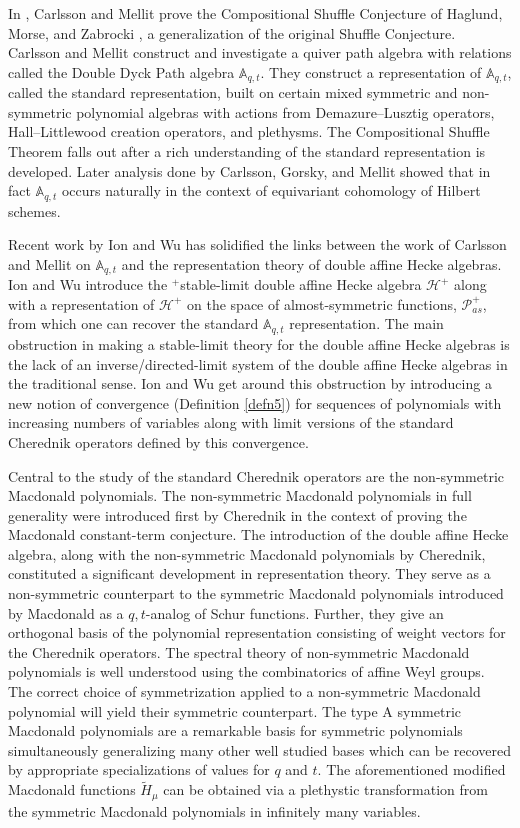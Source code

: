 \documentclass[11pt]{article}
\theoremstyle{definition}
\numberwithin{equation}{section}
\begin{document}
In \cite{CM_2015}, Carlsson and Mellit prove the Compositional Shuffle Conjecture of Haglund, Morse, and Zabrocki \cite{HMZ}, a generalization of the original Shuffle Conjecture. Carlsson and Mellit construct and investigate a quiver path algebra with relations called the Double Dyck Path algebra $\mathbb{A}_{q,t}$. They construct a representation of $\mathbb{A}_{q,t}$, called the standard representation, built on certain mixed symmetric and non-symmetric polynomial algebras with actions from Demazure--Lusztig operators, Hall--Littlewood creation operators, and plethysms. The Compositional Shuffle Theorem 
falls out after a rich understanding of the standard representation is developed. Later analysis done by Carlsson, Gorsky, and Mellit \cite{GCM_2017} showed that in fact $\mathbb{A}_{q,t}$ occurs naturally in the context of equivariant cohomology of Hilbert schemes. 

Recent work by Ion and Wu \cite{Ion_2022} has solidified the links between the work of Carlsson and Mellit on $\mathbb{A}_{q,t}$ and the representation theory of double affine Hecke algebras. Ion and Wu introduce the $^+$stable-limit double affine Hecke algebra $\mathscr{H}^{+}$ along with a representation of $\mathscr{H}^{+}$ on the space of almost-symmetric functions, $\mathscr{P}_{as}^{+}$, from which one can recover the standard $\mathbb{A}_{q,t}$ representation. The main obstruction in making a stable-limit theory for the double affine Hecke algebras is the lack of an inverse/directed-limit system of the double affine Hecke algebras in the traditional sense. Ion and Wu get around this obstruction by introducing a new notion of convergence (Definition \ref{defn5}) for sequences of polynomials with increasing numbers of variables along with limit versions of the standard Cherednik operators defined by this convergence. 

Central to the study of the standard Cherednik operators are the non-symmetric Macdonald polynomials. The non-symmetric Macdonald polynomials in full generality were introduced first by Cherednik \cite{C_2003} in the context of proving the Macdonald constant-term conjecture. The introduction of the double affine Hecke algebra, along with the non-symmetric Macdonald polynomials by Cherednik, constituted a significant development in representation theory. They serve as a non-symmetric counterpart to the symmetric Macdonald polynomials introduced by Macdonald as a $q,t$-analog of Schur functions. Further, they give an orthogonal basis of the polynomial representation consisting of weight vectors for the Cherednik operators. The spectral theory of non-symmetric Macdonald polynomials is well understood using the combinatorics of affine Weyl groups. The correct choice of symmetrization applied to a non-symmetric Macdonald polynomial will yield their symmetric counterpart. The type A symmetric Macdonald polynomials are a remarkable basis for symmetric polynomials simultaneously generalizing many other well studied bases which can be recovered by appropriate specializations of values for $q$ and $t$. The aforementioned modified Macdonald functions $\widetilde{H}_{\mu}$ can be obtained via a plethystic transformation from the symmetric Macdonald polynomials in infinitely many variables.
\end{document}
